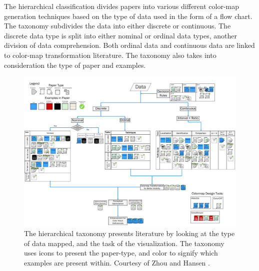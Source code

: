 The hierarchical classification divides papers into various different color-map generation techniques based on the type of data used in the form of a flow chart. The taxonomy subdivides the data into either discrete or continuous. The discrete data type is split into either nominal or ordinal data types, another division of data comprehension. Both ordinal data and continuous data are linked to color-map transformation literature. The taxonomy also takes into consideration the type of paper and examples.


\begin{figure}[t]
\begin{center}
\includegraphics[width=1\textwidth]{images/zhou2015survey}
\caption{The hierarchical taxonomy presents literature by looking at the type of data mapped, and the task of the visualization. The taxonomy uses icons to present the paper-type, and color to signify which examples are present within. Courtesy of Zhou and Hansen \cite{zhou2015survey} .} \label{fig: zhou2015survey}
\end{center}
\end{figure}

